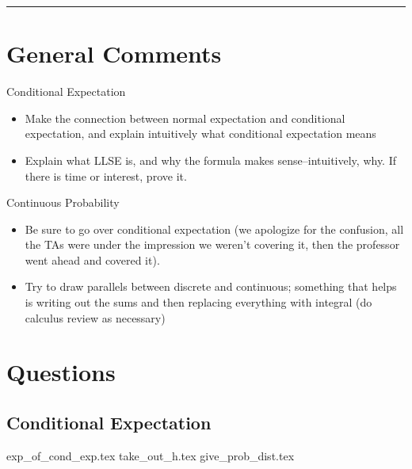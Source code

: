 \documentclass{exam}
\title{}
\date{Conditional Expectation, Continuous Probability, Continuous Distributions}
\begin{document}
\maketitle
\rule{\textwidth}{0.15em}
\fontsize{12}{15}\selectfont
\thispagestyle{empty}


\section{General Comments}
\begin{questions}
\item Conditional Expectation
\begin{itemize}
\item Make the connection between normal expectation and conditional expectation, and explain intuitively what conditional expectation means
\item Explain what LLSE is, and why the formula makes sense--intuitively, why. If there is time or interest, prove it.
\end{itemize}
\item Continuous Probability
\begin{itemize}
\item Be sure to go over conditional expectation (we apologize for the confusion, all the TAs were under the impression we weren't covering it, then the professor went ahead and covered it).
\item Try to draw parallels between discrete and continuous; something that helps is writing out the sums and then replacing everything with integral (do calculus review as necessary)
\end{itemize}

\end{questions}

\section{Questions}
\subsection{Conditional Expectation}
\begin{enumerate}
{exp_of_cond_exp.tex}
{take_out_h.tex}
{give_prob_dist.tex}
\end{enumerate}
\end{document}
